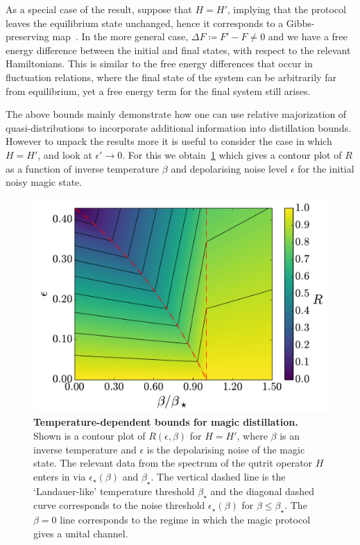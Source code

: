 \documentclass[pra,
aps,
twocolumn,
superscriptaddress,
groupedaddress,
nofootinbib,
reprint
]{revtex4-1}
\begin{document}
 As a special case of the result, suppose that $H=H'$, implying that the protocol leaves the equilibrium state unchanged, hence it corresponds to a Gibbs-preserving map~\cite{faist_2015}. In the more general case, $\Delta F \coloneqq F' - F \ne 0$ and we have a free energy difference between the initial and final states, with respect to the relevant Hamiltonians. This is similar to the free energy differences that occur in fluctuation relations, where the final state of the system can be arbitrarily far from equilibrium, yet a free energy term for the final system still arises.

 The above bounds mainly demonstrate how one can use relative majorization of quasi-distributions to incorporate additional information into distillation bounds. However to unpack the results more it is useful to consider the case in which $H=H'$, and look at $\epsilon' \rightarrow 0$. For this we obtain~\cref{fig:rate_contour} which gives a contour plot of $R$ as a function of inverse temperature $\beta$ and depolarising noise level $\epsilon$ for the initial noisy magic state.
\begin{figure}[t!]
    \centering
    \includegraphics[scale=0.45]{figs/rate_scatter.pdf}
    \caption{\textbf{Temperature-dependent bounds for magic distillation.}
  Shown is a contour plot of  $R(\epsilon, \beta)$ for $H=H'$, where $\beta$ is an inverse temperature and $\epsilon$ is the depolarising noise of the magic state. The relevant data from the spectrum of the qutrit operator $H$ enters in via $\epsilon_\star(\beta)$ and $\beta_\star$.  The vertical dashed line is the `Landauer-like' temperature threshold $\beta_\star$ and the diagonal dashed curve corresponds to the noise threshold $\epsilon_\star (\beta)$ for $\beta \leq \beta_\star$. The $\beta =0 $ line corresponds to the regime in which the magic protocol gives a unital channel.
    }
    \label{fig:rate_contour}
\end{figure}
\end{document}
